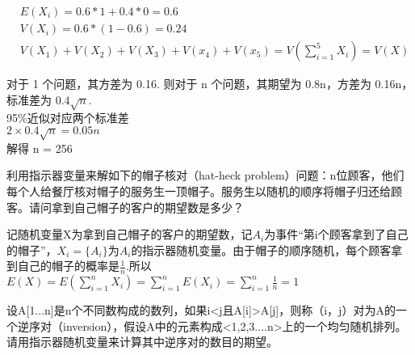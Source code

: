 \documentclass[a4paper, justified]{tufte-handout}
\begin{document}
\begin{problem}[CS 5.7-2]
\end{problem}

\begin{solution}
  $$
    \begin{aligned}
       & E\left(X_{i}\right)=0.6 * 1+0.4 * 0=0.6                                                                                                     \\
       & V\left(X_{i}\right)=0.6 *(1-0.6)=0.24                                                                                                       \\
       & V\left(X_{1}\right)+V\left(X_{2}\right)+V\left(X_{3}\right)+V\left(x_{4}\right)+V\left(x_{5}\right)=V\left(\sum_{i=1}^{5} X_{i}\right)=V(X)
    \end{aligned}
  $$
\end{solution}

\begin{problem}[CS 5.7-12]
\end{problem}

\begin{solution}
  对于 1 个问题，其方差为 0.16.
  则对于 n 个问题，其期望为 0.8n，方差为 0.16n，标准差为 $0.4\sqrt{n}$.\\
  95\%近似对应两个标准差\\
  $2 \times 0.4\sqrt{n}= 0.05n$\\
  解得 n = 256
\end{solution}

\begin{problem}[TC 5.2-4]
利用指示器变量来解如下的帽子核对（hat-heck problem）问题：n位顾客，他们每个人给餐厅核对帽子的服务生一顶帽子。服务生以随机的顺序将帽子归还给顾客。请问拿到自己帽子的客户的期望数是多少？
\end{problem}

\begin{solution}
  记随机变量X为拿到自己帽子的客户的期望数，记$A_i$为事件“第i个顾客拿到了自己的帽子”，$X_i = \{A_i\}$为$A_i$的指示器随机变量。由于帽子的顺序随机，每个顾客拿到自己的帽子的概率是$\frac{1}{n}$.所以$E(X) = E(\sum^n_{i=1}X_i) = \sum^n_{i=1}E(X_i) = \sum^n_{i=1}\frac{1}{n} = 1$\\
\end{solution}

\begin{problem}[TC 5.2-5]
设A[1...n]是n个不同数构成的数列，如果i<j且A[i]>A[j]，则称（i，j）对为A的一个逆序对（inversion），假设A中的元素构成<1,2,3....n>上的一个均匀随机排列。请用指示器随机变量来计算其中逆序对的数目的期望。
\end{problem}
\end{document}
